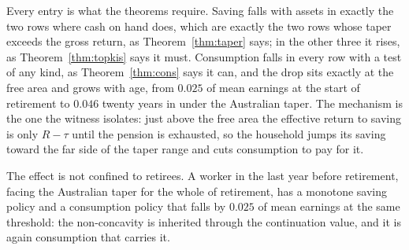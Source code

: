 Every entry is what the theorems require. Saving falls with assets in exactly the two rows where
cash on hand does, which are exactly the two rows whose taper exceeds the gross return, as
Theorem~\ref{thm:taper} says; in the other three it rises, as Theorem~\ref{thm:topkis} says it
must. Consumption falls in every row with a test of any kind, as Theorem~\ref{thm:cons} says it
can, and the drop sits exactly at the free area and grows with age, from $0.025$ of mean earnings
at the start of retirement to $0.046$ twenty years in under the Australian taper. The mechanism is
the one the witness isolates: just above the free area the effective return to saving is only
$R-\tau$ until the pension is exhausted, so the household jumps its saving toward the far side of
the taper range and cuts consumption to pay for it.

The effect is not confined to retirees. A worker in the last year before retirement, facing the
Australian taper for the whole of retirement, has a monotone saving policy and a consumption
policy that falls by $0.025$ of mean earnings at the same threshold: the non-concavity is
inherited through the continuation value, and it is again consumption that carries it.
